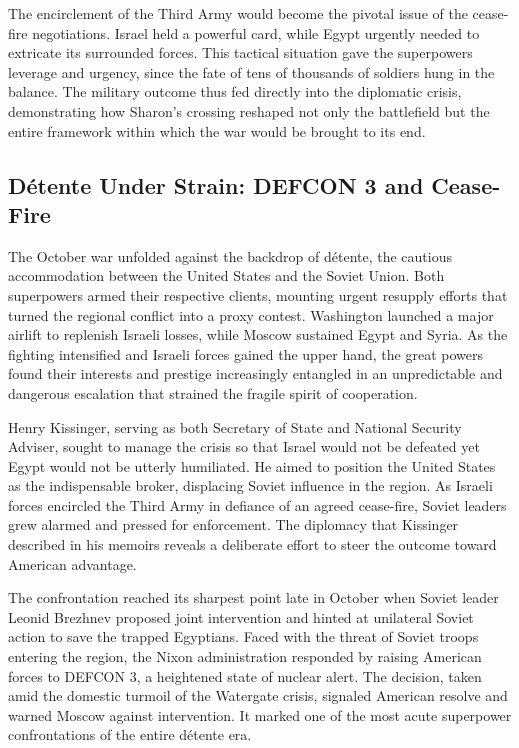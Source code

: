 The encirclement of the Third Army would become the pivotal issue of the cease-fire negotiations. Israel held a powerful card, while Egypt urgently needed to extricate its surrounded forces. This tactical situation gave the superpowers leverage and urgency, since the fate of tens of thousands of soldiers hung in the balance. The military outcome thus fed directly into the diplomatic crisis, demonstrating how Sharon's crossing reshaped not only the battlefield but the entire framework within which the war would be brought to its end. \cite{herzog1975} \cite{rabinovich2004} \cite{bregman2002}

\subsection{Détente Under Strain: DEFCON 3 and Cease-Fire}
The October war unfolded against the backdrop of détente, the cautious accommodation between the United States and the Soviet Union. Both superpowers armed their respective clients, mounting urgent resupply efforts that turned the regional conflict into a proxy contest. Washington launched a major airlift to replenish Israeli losses, while Moscow sustained Egypt and Syria. As the fighting intensified and Israeli forces gained the upper hand, the great powers found their interests and prestige increasingly entangled in an unpredictable and dangerous escalation that strained the fragile spirit of cooperation.

Henry Kissinger, serving as both Secretary of State and National Security Adviser, sought to manage the crisis so that Israel would not be defeated yet Egypt would not be utterly humiliated. He aimed to position the United States as the indispensable broker, displacing Soviet influence in the region. As Israeli forces encircled the Third Army in defiance of an agreed cease-fire, Soviet leaders grew alarmed and pressed for enforcement. The diplomacy that Kissinger described in his memoirs reveals a deliberate effort to steer the outcome toward American advantage.

The confrontation reached its sharpest point late in October when Soviet leader Leonid Brezhnev proposed joint intervention and hinted at unilateral Soviet action to save the trapped Egyptians. Faced with the threat of Soviet troops entering the region, the Nixon administration responded by raising American forces to DEFCON 3, a heightened state of nuclear alert. The decision, taken amid the domestic turmoil of the Watergate crisis, signaled American resolve and warned Moscow against intervention. It marked one of the most acute superpower confrontations of the entire détente era.


